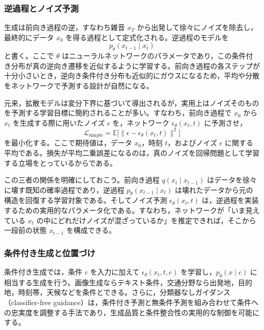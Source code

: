 \subsubsection{逆過程とノイズ予測}

生成は前向き過程の逆，すなわち雑音 \(x_T\) から出発して徐々にノイズを除去し，最終的にデータ \(x_0\) を得る過程として定式化される。逆過程のモデルを
\begin{equation}
p_{\theta}(x_{t-1} \mid x_t)
\end{equation}
と書く。ここで \(\theta\) はニューラルネットワークのパラメータであり，この条件付き分布が真の逆向き遷移を近似するように学習する。前向き過程の各ステップが十分小さいとき，逆向き条件付き分布も近似的にガウスになるため，平均や分散をネットワークで予測する設計が自然になる。

元来，拡散モデルは変分下界に基づいて導出されるが，実用上はノイズそのものを予測する学習目標に簡約されることが多い。すなわち，前向き過程で \(x_0\) から \(x_t\) を生成する際に用いたノイズ \(\epsilon\) を，ネットワーク \(\epsilon_{\theta}(x_t,t)\) に予測させ，
\begin{equation}
\mathcal{L}_{\text{simple}}
=
\mathbb{E}\bigl[\|\epsilon - \epsilon_{\theta}(x_t,t)\|^2\bigr]
\end{equation}
を最小化する。ここで期待値は，データ \(x_0\)，時刻 \(t\)，およびノイズ \(\epsilon\) に関する平均である。損失が平均二乗誤差になるのは，真のノイズを回帰問題として学習する立場をとっているからである。

この三者の関係を明確にしておこう。前向き過程 \(q(x_t \mid x_{t-1})\) はデータを徐々に壊す既知の確率過程であり，逆過程 \(p_{\theta}(x_{t-1}\mid x_t)\) は壊れたデータから元の構造を回復する学習対象である。そしてノイズ予測 \(\epsilon_{\theta}(x_t,t)\) は，逆過程を実装するための実用的なパラメータ化である。すなわち，ネットワークが「いま見えている \(x_t\) の中にどれだけノイズが混ざっているか」を推定できれば，そこから一段前の状態 \(x_{t-1}\) を構成できる。

\subsubsection{条件付き生成と位置づけ}

条件付き生成では，条件 \(c\) を入力に加えて \(\epsilon_{\theta}(x_t,t,c)\) を学習し，\(p_{\theta}(x \mid c)\) に相当する生成を行う。画像生成ならテキスト条件，交通分野なら出発地，目的地，時刻帯，天候などを条件とできる。さらに，分類器なしガイダンス（classifier-free guidance）\cite{Ho2022}は，条件付き予測と無条件予測を組み合わせて条件への忠実度を調整する手法であり，生成品質と条件整合性の実用的な制御を可能にする。

